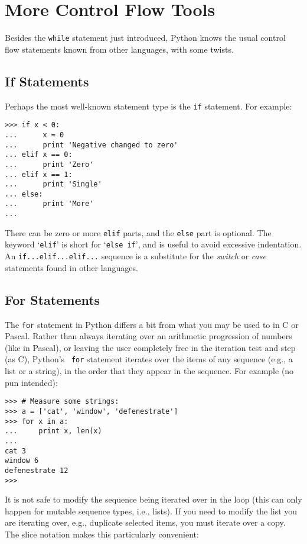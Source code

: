 \chapter{More Control Flow Tools}

Besides the {\tt while} statement just introduced, Python knows the
usual control flow statements known from other languages, with some
twists.

\section{If Statements}

Perhaps the most well-known statement type is the {\tt if} statement.
For example:

\bcode\begin{verbatim}
>>> if x < 0:
...      x = 0
...      print 'Negative changed to zero'
... elif x == 0:
...      print 'Zero'
... elif x == 1:
...      print 'Single'
... else:
...      print 'More'
... 
\end{verbatim}\ecode
%
There can be zero or more {\tt elif} parts, and the {\tt else} part is
optional.  The keyword `{\tt elif}' is short for `{\tt else if}', and is
useful to avoid excessive indentation.  An {\tt if...elif...elif...}
sequence is a substitute for the {\em switch} or {\em case} statements
found in other languages.

\section{For Statements}

The {\tt for} statement in Python differs a bit from what you may be
used to in C or Pascal.  Rather than always iterating over an
arithmetic progression of numbers (like in Pascal), or leaving the user
completely free in the iteration test and step (as C), Python's {\tt
for} statement iterates over the items of any sequence (e.g., a list
or a string), in the order that they appear in the sequence.  For
example (no pun intended):

\bcode\begin{verbatim}
>>> # Measure some strings:
>>> a = ['cat', 'window', 'defenestrate']
>>> for x in a:
...     print x, len(x)
... 
cat 3
window 6
defenestrate 12
>>> 
\end{verbatim}\ecode
%
It is not safe to modify the sequence being iterated over in the loop
(this can only happen for mutable sequence types, i.e., lists).  If
you need to modify the list you are iterating over, e.g., duplicate
selected items, you must iterate over a copy.  The slice notation
makes this particularly convenient:


